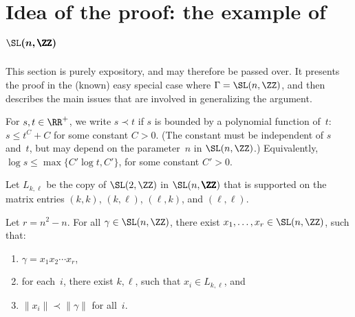 \section[Idea of the proof: the example of $\SL(n,\pmb\ZZ)$]{Idea of the proof: the example of $\boldsymbol{\SL(n,\pmb\ZZ)}$} \label{SLnZSect}

This section is purely expository, and may therefore be passed over. It presents the proof in the (known) easy special case where $\Gamma = \SL(n,\ZZ)$, and then describes the main issues that are involved in generalizing the argument.

\begin{notation} \label{PrecNotation}
For $s,t \in \RR^+$, we write $s \prec t$ if $s$ is bounded by a polynomial function of~$t$: $s \le t^C + C$ for some constant $C > 0$. (The constant must be independent of $s$ and~$t$, but may depend on the parameter~$n$ in $\SL(n,\ZZ)$.) Equivalently, $\log s \le \max\{C' \log t, C'\}$, for some constant $C' > 0$.
\end{notation}

\begin{notation}
Let $L_{k,\ell}$ be the copy of $\SL(2,\ZZ)$ in $\SL(n,\pmb\ZZ)$ that is supported on the matrix entries $(k,k)$, $(k,\ell)$, $(\ell,k)$, and $(\ell,\ell)$.
\end{notation}

\begin{prop} \label{SLnZThm}
Let $r = n^2 - n$. For all $\gamma \in \SL(n, \ZZ)$, there exist $x_1,\ldots,x_r \in \SL(n, \ZZ)$, such that:
\begin{enumerate}\itemsep=0pt
\item[$1)$] $\gamma = x_1 x_2 \cdots x_r$,
\item[$2)$] for each~$i$, there exist $k,\ell$, such that $x_i \in L_{k,\ell}$,
	and
\item[$3)$] $\|x_i\| \prec \|\gamma\|$ for all~$i$.
	\end{enumerate}
\end{prop}

